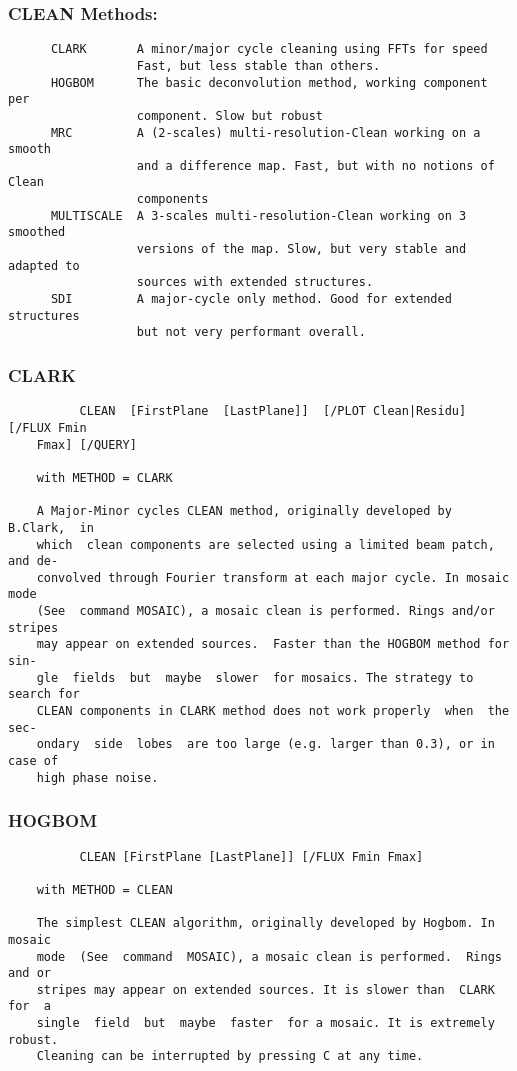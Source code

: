 \subsubsection{CLEAN Methods:}
\begin{verbatim}
      CLARK       A minor/major cycle cleaning using FFTs for speed
                  Fast, but less stable than others.
      HOGBOM      The basic deconvolution method, working component per
                  component. Slow but robust
      MRC         A (2-scales) multi-resolution-Clean working on a smooth
                  and a difference map. Fast, but with no notions of Clean
                  components
      MULTISCALE  A 3-scales multi-resolution-Clean working on 3 smoothed
                  versions of the map. Slow, but very stable and adapted to
                  sources with extended structures.
      SDI         A major-cycle only method. Good for extended structures
                  but not very performant overall.
\end{verbatim}
\subsubsection{CLARK}
\begin{verbatim}
          CLEAN  [FirstPlane  [LastPlane]]  [/PLOT Clean|Residu] [/FLUX Fmin
    Fmax] [/QUERY]

    with METHOD = CLARK

    A Major-Minor cycles CLEAN method, originally developed by  B.Clark,  in
    which  clean components are selected using a limited beam patch, and de-
    convolved through Fourier transform at each major cycle. In mosaic  mode
    (See  command MOSAIC), a mosaic clean is performed. Rings and/or stripes
    may appear on extended sources.  Faster than the HOGBOM method for  sin-
    gle  fields  but  maybe  slower  for mosaics. The strategy to search for
    CLEAN components in CLARK method does not work properly  when  the  sec-
    ondary  side  lobes  are too large (e.g. larger than 0.3), or in case of
    high phase noise.

\end{verbatim}
\subsubsection{HOGBOM}
\begin{verbatim}
          CLEAN [FirstPlane [LastPlane]] [/FLUX Fmin Fmax]

    with METHOD = CLEAN

    The simplest CLEAN algorithm, originally developed by Hogbom. In  mosaic
    mode  (See  command  MOSAIC), a mosaic clean is performed.  Rings and or
    stripes may appear on extended sources. It is slower than  CLARK  for  a
    single  field  but  maybe  faster  for a mosaic. It is extremely robust.
    Cleaning can be interrupted by pressing C at any time.

\end{verbatim}
